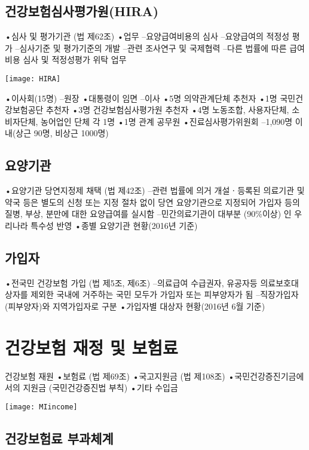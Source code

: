 \subsection{건강보험심사평가원(HIRA)}
•심사 및 평가기관 (법 제62조)
•업무
–요양급여비용의 심사
–요양급여의 적정성 평가
–심사기준 및 평가기준의 개발
–관련 조사연구 및 국제협력
–다른 법률에 따른 급여비용 심사 및 적정성평가 위탁 업무
\begin{center}
\texttt{[image: HIRA]}
\end{center}
•이사회(15명)
–원장
•대통령이 임면
–이사
•5명 의약관계단체 추천자
•1명 국민건강보험공단 추천자
•3명 건강보험심사평가원 추천자
•4명 노동조합, 사용자단체, 소비자단체, 농어업인 단체 각 1명
•1명 관계 공무원
•진료심사평가위원회
–1,090명 이내(상근 90명, 비상근 1000명)

\subsection{요양기관}
•요양기관 당연지정제 채택 (법 제42조)
–관련 법률에 의거 개설ㆍ등록된 의료기관 및 약국 등은 별도의 신청 또는 지정 절차 없이 당연 요양기관으로 지정되어 가입자 등의 질병, 부상, 분만에 대한 요양급여를 실시함
–민간의료기관이 대부분 (90\%이상) 인 우리나라 특수성 반영
•종별 요양기관 현황(2016년 기준)

\subsection{가입자}
•전국민 건강보험 가입 (법 제5조, 제6조)
–의료급여 수급권자, 유공자등 의료보호대상자를 제외한 국내에 거주하는 국민 모두가 가입자 또는 피부양자가 됨
–직장가입자(피부양자)와 지역가입자로 구분
•가입자별 대상자 현황(2016년 6월 기준)

\section{건강보험 재정 및 보험료}
건강보험 재원
•보험료 (법 제69조)
•국고지원금 (법 제108조)
•국민건강증진기금에서의 지원금
(국민건강증진법 부칙)
•기타 수입금
\begin{center}
\texttt{[image: MIincome]}
\end{center}

\subsection{건강보험료 부과체계}

